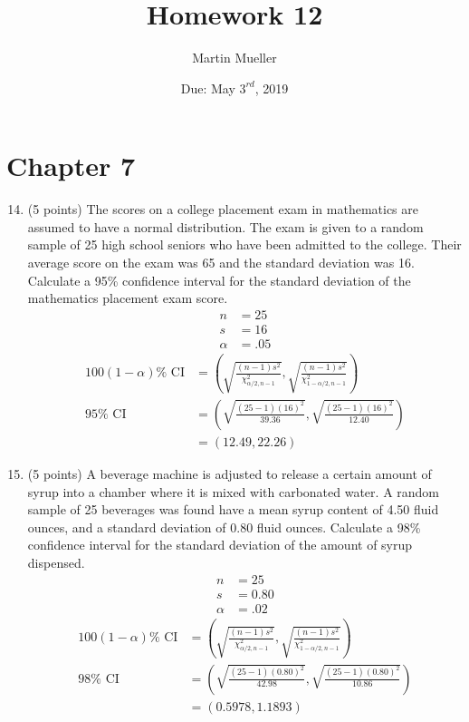 \documentclass[12pt, letter]{article}
\title{Homework 12}
\author{Martin Mueller}
\date{Due: May $3^{rd}$, 2019}
\begin{document}
\maketitle

\section*{Chapter 7}

\begin{enumerate}
	\setcounter{enumi}{13}
	\item (5 points) The scores on a college placement exam in mathematics are assumed to have a normal distribution. The exam is given to a random sample of 25 high school seniors who have been admitted to the college. Their average score on the exam was 65 and the standard deviation was 16. Calculate a 95\% confidence interval for the standard deviation of the mathematics placement exam score.
	\begin{align*}
		n &= 25 \\
		s &= 16 \\
		\alpha &= .05
	\end{align*}
	\begin{align*}
		100(1 - \alpha)\% \text{ CI} &= \left(\sqrt{\frac{(n-1)s^{2}}{\chi^{2}_{\alpha/2, n-1}}}, \sqrt{\frac{(n-1)s^{2}}{\chi^{2}_{1-\alpha/2, n-1}}}\right) \\
		95\% \text{ CI} &= \left(\sqrt{\frac{(25-1)(16)^{2}}{39.36}}, \sqrt{\frac{(25-1)(16)^{2}}{12.40}}\right) \\
		&= \boxed{(12.49, 22.26)}
	\end{align*}
	
	\item (5 points) A beverage machine is adjusted to release a certain amount of syrup into a chamber where it is mixed with carbonated water. A random sample of 25 beverages was found have a mean syrup content of 4.50 fluid ounces, and a standard deviation of 0.80 fluid ounces. Calculate a 98\% confidence interval for the standard deviation of the amount of syrup dispensed.
	\begin{align*}
		n &= 25 \\
		s &= 0.80 \\
		\alpha &= .02
	\end{align*}
	\begin{align*}
		100(1 - \alpha)\% \text{ CI} &= \left(\sqrt{\frac{(n-1)s^{2}}{\chi^{2}_{\alpha/2, n-1}}}, \sqrt{\frac{(n-1)s^{2}}{\chi^{2}_{1-\alpha/2, n-1}}}\right) \\
		98\% \text{ CI} &= \left(\sqrt{\frac{(25-1)(0.80)^{2}}{42.98}}, \sqrt{\frac{(25-1)(0.80)^{2}}{10.86}}\right) \\
		&= \boxed{(0.5978, 1.1893)}
	\end{align*}
\end{enumerate}
\end{document}
